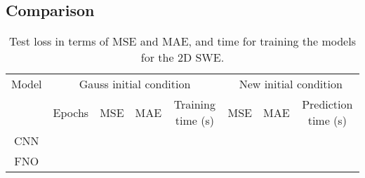 \subsection*{Comparison}
\begin{table}[H]
    \centering
    \small %
    \begin{tabular}{c|cccc|ccc}
        Model & \multicolumn{4}{c|}{Gauss initial condition} & \multicolumn{3}{c}{New initial condition} \\
        \cline{2-8}
        & Epochs & MSE & MAE & Training time (s)  & MSE & MAE & Prediction time (s) \\
        \hline
        CNN  &
         &
         & 
         &
         &
         &
         &
         
        \\
        \hline
        FNO  &
         &
         &
         &
         &
         &
         &
        
        \\
        \hline
    \end{tabular}
    \caption{Test loss in terms of MSE and MAE, and time for training the models for the 2D SWE.}\label{tab:results_1D_comparison}
\end{table}


